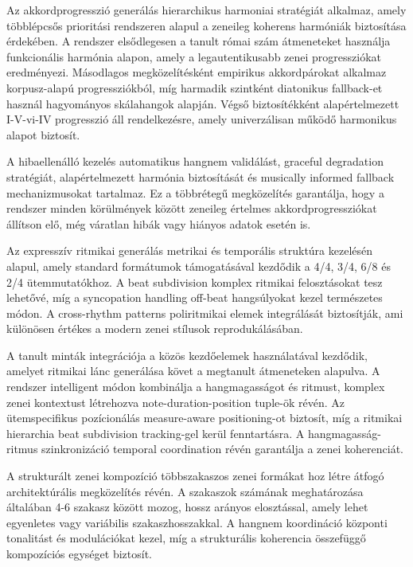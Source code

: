 Az akkordprogresszió generálás hierarchikus harmoniai stratégiát alkalmaz, amely többlépcsős prioritási rendszeren alapul a zeneileg koherens harmóniák biztosítása érdekében. A rendszer elsődlegesen a tanult római szám átmeneteket használja funkcionális harmónia alapon, amely a legautentikusabb zenei progressziókat eredményezi. Másodlagos megközelítésként empirikus akkordpárokat alkalmaz korpusz-alapú progressziókból, míg harmadik szintként diatonikus fallback-et használ hagyományos skálahangok alapján. Végső biztosítékként alapértelmezett I-V-vi-IV progresszió áll rendelkezésre, amely univerzálisan működő harmonikus alapot biztosít.

A hibaellenálló kezelés automatikus hangnem validálást, graceful degradation stratégiát, alapértelmezett harmónia biztosítását és musically informed fallback mechanizmusokat tartalmaz. Ez a többrétegű megközelítés garantálja, hogy a rendszer minden körülmények között zeneileg értelmes akkordprogressziókat állítson elő, még váratlan hibák vagy hiányos adatok esetén is.

Az expresszív ritmikai generálás metrikai és temporális struktúra kezelésén alapul, amely standard formátumok támogatásával kezdődik a 4/4, 3/4, 6/8 és 2/4 ütemmutatókhoz. A beat subdivision komplex ritmikai felosztásokat tesz lehetővé, míg a syncopation handling off-beat hangsúlyokat kezel természetes módon. A cross-rhythm patterns poliritmikai elemek integrálását biztosítják, ami különösen értékes a modern zenei stílusok reprodukálásában.

A tanult minták integrációja a közös kezdőelemek használatával kezdődik, amelyet ritmikai lánc generálása követ a megtanult átmeneteken alapulva. A rendszer intelligent módon kombinálja a hangmagasságot és ritmust, komplex zenei kontextust létrehozva note-duration-position tuple-ök révén. Az ütemspecifikus pozícionálás measure-aware positioning-ot biztosít, míg a ritmikai hierarchia beat subdivision tracking-gel kerül fenntartásra. A hangmagasság-ritmus szinkronizáció temporal coordination révén garantálja a zenei koherenciát.

A strukturált zenei kompozíció többszakaszos zenei formákat hoz létre átfogó architektúrális megközelítés révén. A szakaszok számának meghatározása általában 4-6 szakasz között mozog, hossz arányos elosztással, amely lehet egyenletes vagy variábilis szakaszhosszakkal. A hangnem koordináció központi tonalitást és modulációkat kezel, míg a strukturális koherencia összefüggő kompozíciós egységet biztosít.

